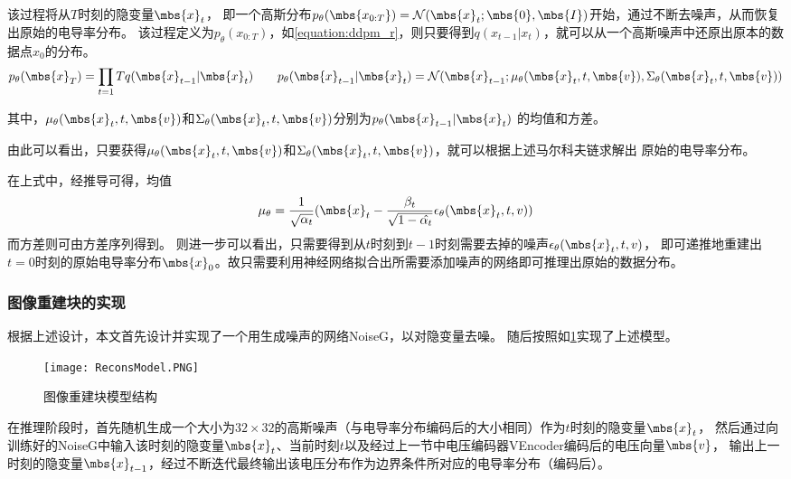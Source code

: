 该过程将从$T$时刻的隐变量$\mbs{x}_{t}$，
即一个高斯分布$p_\theta(\mbs{x_{0:T}}) = \mathcal{N}(\mbs{x}_{t}; \mbs{0},\mbs{I})$开始，通过不断去噪声，从而恢复出原始的电导率分布。
该过程定义为$p_\theta(x_{0:T})$，如\cref{equation:ddpm_r}，则只要得到$q(x_{t-1}|x_t)$，就可以从一个高斯噪声中还原出原本的数据点$x_0$的分布。
\begin{equation}
    \centering
    p_\theta(\mbs{x}_{T}) = \prod_{t=1}{T} q(\mbs{x}_{t-1}|\mbs{x}_{t}) \qquad
    p_\theta(\mbs{x}_{t-1}|\mbs{x}_{t}) = \mathcal{N}(\mbs{x}_{t-1}; \mu_\theta(\mbs{x}_{t}, t, \mbs{v}), \Sigma_\theta(\mbs{x}_{t}, t, \mbs{v}))
    \label{equation:ddpm_r}
\end{equation}

其中，$\mu_\theta(\mbs{x}_{t}, t, \mbs{v})$和$\Sigma_\theta(\mbs{x}_{t}, t, \mbs{v})$分别为$p_\theta(\mbs{x}_{t-1}|\mbs{x}_{t})$
的均值和方差。

由此可以看出，只要获得$\mu_\theta(\mbs{x}_{t}, t, \mbs{v})$和$\Sigma_\theta(\mbs{x}_{t}, t, \mbs{v})$，就可以根据上述马尔科夫链求解出
原始的电导率分布。

在上式中，经推导可得，均值
\begin{equation}
  \mu_\theta = \frac{1}{\sqrt{\alpha_t}}(\mbs{x}_{t} - \frac{\beta_t}{\sqrt{1-\hat{\alpha_t}}}\epsilon_\theta(\mbs{x}_{t}, t, v))  
\end{equation}
而方差则可由方差序列得到。
则进一步可以看出，只需要得到从$t$时刻到$t-1$时刻需要去掉的噪声$\epsilon_\theta(\mbs{x}_{t}, t, v)$，
即可递推地重建出$t=0$时刻的原始电导率分布$\mbs{x}_0$。故只需要利用神经网络拟合出所需要添加噪声的网络即可推理出原始的数据分布。

\subsubsection{图像重建块的实现}

根据上述设计，本文首先设计并实现了一个用生成噪声的网络NoiseG，以对隐变量去噪。
随后按照如\cref{figure:ReconsModel}实现了上述模型。


\begin{figure}[h]
    \centering
    \texttt{[image: ReconsModel.PNG]}
    \caption{图像重建块模型结构}
    \label{figure:ReconsModel}
\end{figure}

在推理阶段时，首先随机生成一个大小为$32\times 32$的高斯噪声（与电导率分布编码后的大小相同）作为$t$时刻的隐变量$\mbs{x}_{t}$，
然后通过向训练好的NoiseG中输入该时刻的隐变量$\mbs{x}_t$、当前时刻$t$以及经过上一节中电压编码器VEncoder编码后的电压向量$\mbs{v}$，
输出上一时刻的隐变量$\mbs{x}_{t-1}$，经过不断迭代最终输出该电压分布作为边界条件所对应的电导率分布（编码后）。

